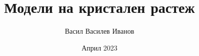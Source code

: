 \documentclass[12pt]{article}
\title{Модели на кристален растеж}
\author{Васил Василев Иванов}
\date{Април 2023}
\begin{document}

\tableofcontents





\nocite{MastersThesisLatexSource}
\printbibliography[heading=bibintoc]
\end{document}
